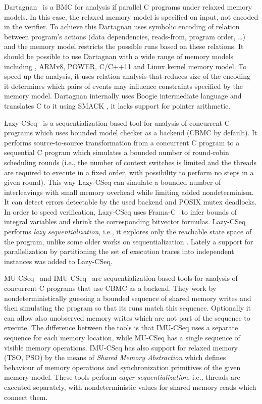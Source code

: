 Dartagnan~ is a BMC for analysis if parallel C programs under relaxed memory models.
In this case, the relaxed memory model is specified on input, not encoded in the verifier.
To achieve this Dartagnan uses symbolic encoding of relation between program's actions (data dependencies, reads-from, program order, …) and the memory model restricts the possible runs based on these relations.
It should be possible to use Dartagnan with a wide range of memory models including \xtso, ARMv8, POWER, C/C++11 and Linux kernel memory model.
To speed up the analysis, it uses relation analysis that reduces size of the encoding -- it determines which pairs of events may influence constraints specified by the memory model.
Dartagnan internally uses Boogie intermediate language and translates C to it using SMACK , it lacks support for pointer arithmetic.

Lazy-CSeq~ is a se\-quen\-tial\-iza\-tion-based
tool for analysis of concurrent C programs which uses bounded model checker as
a backend (CBMC by default).
It performs source-to-source transformation from a concurrent C program to a
sequential C program which simulates a bounded number of round-robin scheduling
rounds (i.e., the number of context switches is limited and the threads are
required to execute in a fixed order, with possibility to perform no steps in a
given round).
This way Lazy-CSeq can simulate a bounded number of interleavings with small
memory overhead while limiting added nondeterminism.
It can detect errors detectable by the used backend and POSIX mutex deadlocks.
In order to speed verification, Lazy-CSeq uses Frama-C~ to
infer  bounds of integral variables and shrink the corresponding bitvector
formulas.
Lazy-CSeq performs \emph{lazy sequentialization}, i.e., it explores only the reachable state space of the program, unlike some older works on sequentialization .
Lately a support for parallelization by partitioning the set of execution traces into independent instances was added to Lazy-CSeq.


MU-CSeq~ and IMU-CSeq~
are se\-quen\-tial\-iza\-tion-based tools for analysis of concurrent C programs
that use CBMC as a backend.
They work by nondeterministically guessing a bounded sequence of shared memory
writes and then simulating the program so that its runs match this sequence.
Optionally it can allow also unobserved memory writes which are not part of the
sequence to execute.
The difference between the tools is that IMU-CSeq uses a separate sequence for
each memory location, while MU-CSeq has a single sequence of visible memory
operations.
IMU-CSeq has also support for relaxed memory (TSO, PSO) by the means of
\emph{Shared Memory Abstraction} which defines behaviour of memory operations
and synchronization primitives of the given memory model.
These tools perform \emph{eager sequentialization}, i.e., threads are executed separately, with nondeterministic values for shared memory reads which connect them.


